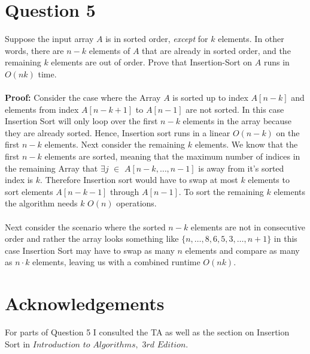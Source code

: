 \documentclass{article}
\begin{document}
\section*{Question 5}
Suppose the input array $A$ is in sorted order,
\emph{except} for $k$ elements. In other words, there are $n-k$ elements of $A$ that
are already in sorted order, and the remaining $k$ elements are out of order. Prove
that Insertion-Sort on $A$ runs in $O(nk)$ time. \\\\
\textbf{Proof:} Consider the case where the Array $A$ is sorted up to index $A[n - k]$ and elements from index $A[n - k + 1]$ to $A[n - 1]$ are not sorted.
In this case Insertion Sort will only loop over the first $n - k$ elements in the array because they are already sorted. Hence, Insertion sort runs in a linear $O{(n - k)}$ on the first $n - k$ elements.
 Next consider the remaining $k$ elements. We know that the first $n - k$ elements are sorted, meaning that the maximum number of indices in the remaining Array
 that $\exists j$ $\in$ $A[n - k,\dots,n - 1]$  is away from it's sorted index is $k$. Therefore Insertion sort would have to swap at most $k$ elements to sort elements $A[n - k - 1]$ through $A[n - 1]$. To sort the remaining $k$ elements the algorithm needs $k$ $O(n)$  operations.\\\\   Next consider the scenario where the sorted $n - k$ elements are not in consecutive order and rather the array looks something like $\{n,\dots,8,6,5,3,\dots,n + 1\}$ in this case Insertion Sort may have
to swap as many $n$ elements and compare as many as $n\cdot k$ elements, leaving us with a combined runtime $O(nk)$.

\section*{Acknowledgements}
For parts of Question 5 I consulted the TA as well as the section on Insertion Sort in $Introduction$ $to$ $Algorithms,$ $3rd$ $Edition$.
\end{document}
